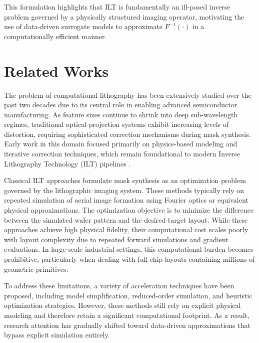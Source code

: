 \documentclass[conference]{IEEEtran}
\begin{document}
This formulation highlights that ILT is fundamentally an ill-posed inverse problem governed by a physically structured imaging operator, motivating the use of data-driven surrogate models to approximate \( F^{-1}(\cdot) \) in a computationally efficient manner.











\section{\textbf{Related Works}}

The problem of computational lithography has been extensively studied over the past two decades due to its central role in enabling advanced semiconductor manufacturing. As feature sizes continue to shrink into deep sub-wavelength regimes, traditional optical projection systems exhibit increasing levels of distortion, requiring sophisticated correction mechanisms during mask synthesis. Early work in this domain focused primarily on physics-based modeling and iterative correction techniques, which remain foundational to modern Inverse Lithography Technology (ILT) pipelines \cite{b4}\cite{b5}.

Classical ILT approaches formulate mask synthesis as an optimization problem governed by the lithographic imaging system. These methods typically rely on repeated simulation of aerial image formation using Fourier optics or equivalent physical approximations. The optimization objective is to minimize the difference between the simulated wafer pattern and the desired target layout. While these approaches achieve high physical fidelity, their computational cost scales poorly with layout complexity due to repeated forward simulations and gradient evaluations. In large-scale industrial settings, this computational burden becomes prohibitive, particularly when dealing with full-chip layouts containing millions of geometric primitives.

To address these limitations, a variety of acceleration techniques have been proposed, including model simplification, reduced-order simulation, and heuristic optimization strategies. However, these methods still rely on explicit physical modeling and therefore retain a significant computational footprint. As a result, research attention has gradually shifted toward data-driven approximations that bypass explicit simulation entirely.
\end{document}
